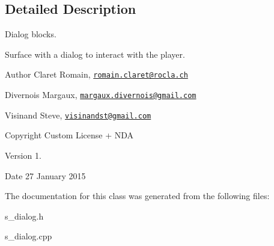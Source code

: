 \subsection{Detailed Description}
Dialog blocks. 

Surface with a dialog to interact with the player. \begin{DoxyAuthor}{Author}
Claret Romain, \href{mailto:romain.claret@rocla.ch}{\tt romain.\+claret@rocla.\+ch} 

Divernois Margaux, \href{mailto:margaux.divernois@gmail.com}{\tt margaux.\+divernois@gmail.\+com} 

Visinand Steve, \href{mailto:visinandst@gmail.com}{\tt visinandst@gmail.\+com} 
\end{DoxyAuthor}
\begin{DoxyCopyright}{Copyright}
Custom License + N\+D\+A 
\end{DoxyCopyright}
\begin{DoxyVersion}{Version}
1. 
\end{DoxyVersion}
\begin{DoxyDate}{Date}
27 January 2015 
\end{DoxyDate}


The documentation for this class was generated from the following files\+:\begin{DoxyCompactItemize}
\item 
s\+\_\+dialog.\+h\item 
s\+\_\+dialog.\+cpp\end{DoxyCompactItemize}
